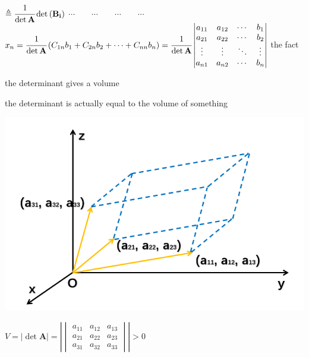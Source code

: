 \documentclass[12pt, a4paper]{article}
\begin{document}
{\begin{math}
	\triangleq 
	\cfrac{1}{\det{\mathbf{A}}}\det{\left( {\mathbf{B_i}} \right)}
\end{math}
\newline
$\cdots \qquad \cdots \qquad \cdots \qquad \cdots$
\newline
\begin{math}
	x_n = 
	\cfrac{1}{\det{\mathbf{A}}}
	\left(
	C_{1n}b_1 + C_{2n}b_2 + \cdots + C_{nn}b_n
	\right)
	=
	\cfrac{1}{\det{\mathbf{A}}}
	\begin{vmatrix}
		a_{11} & a_{12} & \cdots & b_1 \\
		a_{21} & a_{22} & \cdots & b_2 \\
		\vdots & \vdots & \ddots & \vdots \\
		a_{n1} & a_{n2} & \cdots & b_n 
	\end{vmatrix}
\end{math}
\vspace{31pt}
\newline
{\textcolor{anhao-scarlet}{the fact}}
\par the determinant gives a volume
\par the determinant is actually equal to the volume of something
\begin{center}
	\includegraphics[scale=0.6]{figures/S20-1.png}
\end{center}
\begin{math}
	V = 
	\left|
	\det{\mathbf{A}}
	\right|
	 = 
	\left|
	\begin{vmatrix}
		a_{11} & a_{12} & a_{13} \\
		a_{21} & a_{22} & a_{23} \\
		a_{31} & a_{32} & a_{33} 
	\end{vmatrix}
	\right|
	 > 
	0
\end{math}
}
\end{document}
